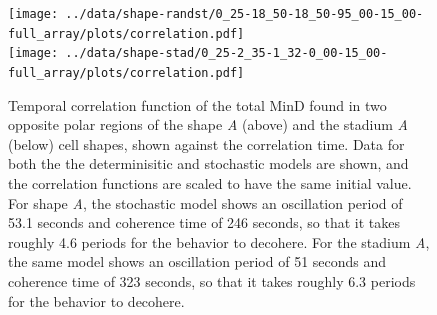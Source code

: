 \documentclass[10pt,letterpaper]{article}
\begin{document}
\begin{figure}
  \begin{center}
    \texttt{[image: ../data/shape-randst/0\_25-18\_50-18\_50-95\_00-15\_00-full\_array/plots/correlation.pdf]}\\
    \texttt{[image: ../data/shape-stad/0\_25-2\_35-1\_32-0\_00-15\_00-full\_array/plots/correlation.pdf]}
  \end{center}
  \caption{Temporal correlation function of the total MinD found in
    two opposite polar regions of the shape \emph{A} (above) and the
    stadium \emph{A} (below) cell shapes, shown against the
    correlation time.  Data for both the the determinisitic and
    stochastic models are shown, and the correlation functions are
    scaled to have the same initial value.  For shape \emph{A}, the
    stochastic model shows an oscillation period of 53.1 seconds and
    coherence time of 246 seconds, so that it takes roughly 4.6 periods
    for the behavior to decohere.  For the stadium \emph{A}, the same
    model shows an oscillation period of 51 seconds and coherence time of
    323 seconds, so that it takes roughly 6.3 periods for the behavior
    to decohere.}
  \label{fig:corr-pancake-A}
\end{figure}

\end{document}
